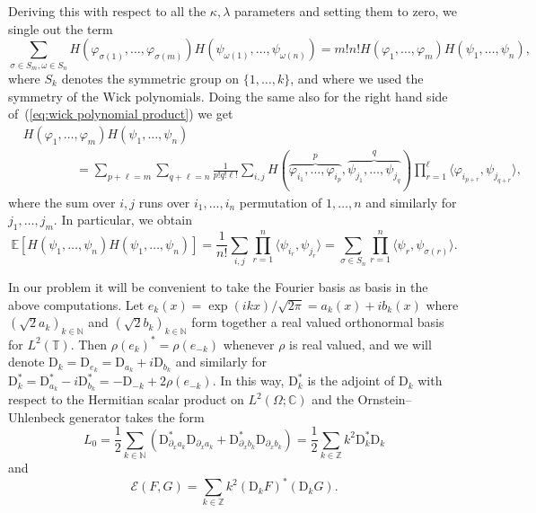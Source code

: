 \documentclass[a4paper,11pt]{article}
\newcommand{\mathD}{\mathrm{D}}
\begin{document}
Deriving this with respect to all the $\kappa, \lambda$ parameters and setting
them to zero, we single out the term
\[ \sum_{\sigma \in S_m, \omega \in S_n} H (\varphi_{\sigma (1)}, \ldots,
   \varphi_{\sigma (m)}) H (\psi_{\omega (1)}, \ldots, \psi_{\omega (n)}) =
   m!n!H (\varphi_1, \ldots, \varphi_m) H (\psi_1, \ldots, \psi_n), \]
where $S_k$ denotes the symmetric group on $\{ 1, \ldots, k \}$, and where we
used the symmetry of the Wick polynomials. Doing the same also for the right
hand side of~(\ref{eq:wick polynomial product}) we get
\begin{align*}
   & H (\varphi_1, \ldots, \varphi_m) H (\psi_1, \ldots, \psi_n) \\
   &\hspace{50pt} = \sum_{p +\ell = m} \sum_{q + \ell = n} \frac{1}{p!q! \ell !} \sum_{i, j} H(\overbrace{\varphi_{i_1}, \ldots, \varphi_{i_p}}^p, \overbrace{\psi_{j_1}, \ldots, \psi_{j_q}}^q) \prod_{r = 1}^{\ell} \langle \varphi_{i_{p + r}}, \psi_{j_{q + r}} \rangle,
\end{align*}
where the sum over $i, j$ runs over $i_1, \ldots, i_n$ permutation of $1,
\ldots, n$ and similarly for $j_1, \ldots, j_m$. In particular, we obtain
\[ \mathbb{E} [H (\psi_1, \ldots, \psi_n) H (\psi_1, \ldots, \psi_n)] =
   \frac{1}{n!} \sum_{i, j} \prod_{r = 1}^n \langle \psi_{i_r}, \psi_{j_r}
   \rangle = \sum_{\sigma \in S_n} \prod_{r = 1}^n \langle \psi_r,
   \psi_{\sigma (r)} \rangle . \]
\begin{remark}
  In our problem it will be convenient to take the Fourier basis as basis in
  the above computations. Let $e_k (x) = \exp (i k x) / \sqrt{2 \pi} = a_k (x)
  + ib_k (x)$ where $\left( \sqrt{2} a_k \right)_{k \in \mathbb{N}}$ and
  $\left( \sqrt{2} b_k \right)_{k \in \mathbb{N}}$ form together a real
  valued orthonormal basis for $L^2 (\mathbb{T})$. Then $\rho (e_k)^{\ast} =
  \rho (e_{- k})$ whenever $\rho$ is real valued, and we will denote $\mathD_k
  = \mathD_{e_k} = \mathD_{a_k} + i \mathD_{b_k}$ and similarly for
  $\mathD^{\ast}_k = \mathD_{a_k}^{\ast} - i \mathD_{b_k}^{\ast} = - \mathD_{-
  k} + 2 \rho (e_{- k})$. In this way, $\mathD^{\ast}_k$ is the adjoint of
  $\mathD_k$ with respect to the Hermitian scalar product on $L^2 (\Omega ;
  \mathbb{C})$ and the Ornstein--Uhlenbeck generator takes the form
  \begin{equation}
    L_0 = \frac{1}{2} \sum_{k \in \mathbb{N}} (\mathD_{\partial_x a_k}^{\ast}
    \mathD_{\partial_x a_k} + \mathD_{\partial_x b_k}^{\ast}
    \mathD_{\partial_x b_k}) = \frac{1}{2} \sum_{k \in \mathbb{Z}} k^2
    \mathD_k^{\ast} \mathD_k
  \end{equation}
  and
  \begin{equation}
    \mathcal{E} (F, G) = \sum_{k \in \mathbb{Z}} k^2 (\mathD_k F)^{\ast}
    (\mathD_k G) .
  \end{equation}
\end{remark}
\end{document}
